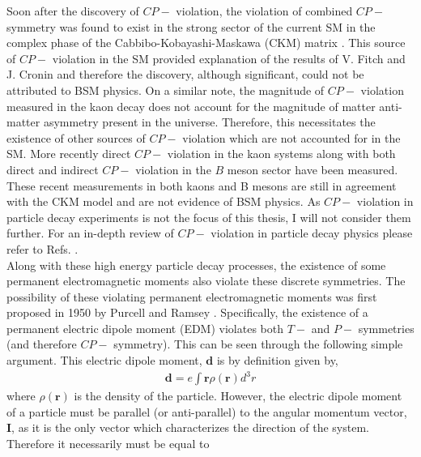 \documentclass[10pt,a4paper, twoside, openright]{report}
\begin{document}
\linebreak
Soon after the discovery of $CP-$ violation, the violation of combined $CP-$ symmetry was found to exist in the strong sector of the current SM in the complex phase of the Cabbibo-Kobayashi-Maskawa (CKM) matrix \cite{Cabibbo1963, KM1973, Kobayashi2009, Maskawa2009}. This source of $CP-$ violation in the SM provided explanation of the results of V. Fitch and J. Cronin and therefore the discovery, although significant, could not be attributed to BSM physics. On a similar note, the magnitude of  $CP-$ violation measured in the kaon decay does not account for the magnitude of matter anti-matter asymmetry present in the universe. Therefore, this necessitates the existence of other sources of $CP-$ violation which are not accounted for in the SM. More recently direct $CP-$ violation in the kaon systems \cite{Alavi1999, Fanti1999} along with both direct and indirect $CP-$ violation in the $B$ meson sector \cite{Belle2001, Aaij2013, Aubert2003} have been measured. These recent measurements in both kaons and B mesons are still in agreement with the CKM model and are not evidence of BSM physics.  As $CP-$ violation in particle decay experiments is not the focus of this thesis, I will not  consider them further. For an in-depth review of $CP-$ violation in particle decay physics please refer to Refs. \cite{Winstein1993, Artuso2016, Hurth2013, Kim2010, Cirigliano2012, Branco2012, Bernabeu2015, Bertolini2000}. \\
\linebreak
Along with these high energy particle decay processes, the existence of some permanent electromagnetic moments also violate these discrete symmetries. The possibility of these violating permanent electromagnetic moments was first proposed in 1950 by Purcell and Ramsey  \cite{Purcell1950}. Specifically, the existence of a permanent electric dipole moment (EDM) violates both $T-$ and $P-$ symmetries (and therefore $CP-$ symmetry)\cite{Landau1957}. This can be seen through the following simple argument. This electric dipole moment, $\textbf{d}$ is by definition given by,  
\begin{align} \label{eq:edm1}
\textbf{d} = e\int \textbf{r}\rho(\textbf{r})d^3r
\end{align}
where $\rho(\textbf{r})$ is the density of the particle. However, the electric dipole moment of a particle must be parallel (or anti-parallel) to the angular momentum vector, $\textbf{I}$, as it is the only vector which characterizes the direction of the system. Therefore it necessarily must be equal to
\end{document}
